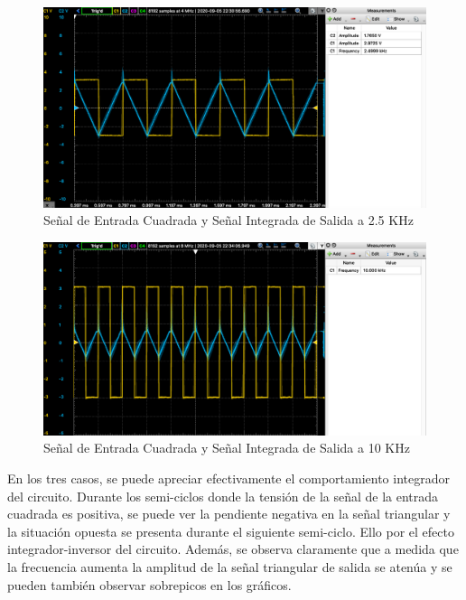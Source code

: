 \begin{figure}[H]
    \centering 
    \includegraphics [scale=0.4] {../Ejercicio3-CircuitoIntegradoresyDerivadores/Imagenes/cuadrada-2500.png} 
    \caption{Señal de Entrada Cuadrada y Señal Integrada de Salida a 2.5 KHz}
    \label{fig:emptyPlotTool}
\end{figure}

\begin{figure}[H]
    \centering 
    \includegraphics [scale=0.4] {../Ejercicio3-CircuitoIntegradoresyDerivadores/Imagenes/cuadrada-10000.png} 
    \caption{Señal de Entrada Cuadrada y Señal Integrada de Salida a 10 KHz}
    \label{fig:emptyPlotTool}
\end{figure}

En los tres casos, se puede apreciar efectivamente el comportamiento integrador del circuito. Durante los semi-ciclos donde la tensión de la señal 
de la entrada cuadrada es positiva, se puede ver la pendiente negativa en la señal triangular y la situación opuesta se presenta durante el siguiente semi-ciclo.
Ello por el efecto integrador-inversor del circuito.
Además, se observa claramente que a medida que la frecuencia aumenta la amplitud de la señal triangular de salida se atenúa y se pueden también observar
sobrepicos en los gráficos.

